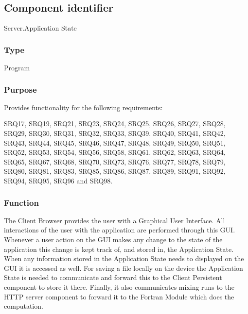 \subsection*{Component identifier}
Server.Application State

\subsubsection*{Type}
Program

\subsubsection*{Purpose}
Provides functionality for the following requirements:

\noindent{} SRQ17, SRQ19, SRQ21, SRQ23, SRQ24, SRQ25, SRQ26, SRQ27, SRQ28, SRQ29, SRQ30, SRQ31, SRQ32, SRQ33, SRQ39, SRQ40, SRQ41, SRQ42, SRQ43, SRQ44, SRQ45, SRQ46, SRQ47, SRQ48, SRQ49, SRQ50, SRQ51, SRQ52, SRQ53, SRQ54, SRQ56, SRQ58, SRQ61, SRQ62, SRQ63, SRQ64, SRQ65, SRQ67, SRQ68, SRQ70, SRQ73, SRQ76, SRQ77, SRQ78, SRQ79, SRQ80, SRQ81, SRQ83, SRQ85, SRQ86, SRQ87, SRQ89, SRQ91, SRQ92, SRQ94, SRQ95, SRQ96 and SRQ98.


\subsubsection*{Function}
The Client Browser provides the user with a Graphical User Interface. All interactions of the user with the application are performed through this GUI. Whenever a user action on the GUI makes any change to the state of the application this change is kept track of, and stored in, the Application State. When any information stored in the Application State needs to displayed on the GUI it is accessed as well. For saving a file locally on the device the Application State is needed to communicate and forward this to the Client Persistent component to store it there. Finally, it also communicates mixing runs to the HTTP server component to forward it to the Fortran Module which does the computation.

